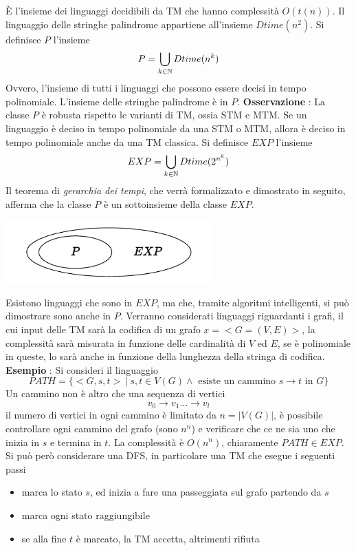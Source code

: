 \documentclass[10pt, letterpaper]{report}
\begin{document}
È l'insieme dei linguaggi decidibili da TM che hanno complessità $O(t(n))$. Il linguaggio delle stringhe palindrome appartiene all'insieme $Dtime(n^2)$.\acc 
{} Si definisce $P$ l'insieme 
$$ P=\bigcup_{k\in {\mathbb N}}Dtime(n^k)$$
Ovvero, l'insieme di tutti i linguaggi che possono essere decisi in tempo polinomiale. L'insieme delle stringhe palindrome è in $P$. \acc 
\textbf{Osservazione} : La classe $P$ è robusta rispetto le varianti di TM, ossia STM e MTM. Se un linguaggio è deciso in tempo polinomiale da una STM o MTM, allora è deciso in tempo polinomiale anche da una TM classica.\acc 
{} Si definisce $EXP$ l'insieme 
$$ EXP=\bigcup_{k\in {\mathbb N}}Dtime(2^{n^k})$$
Il teorema di \textit{gerarchia dei tempi}, che verrà formalizzato e dimostrato in seguito, afferma che la classe $P$ è un sottoinsieme della classe $EXP$.\begin{center}
    \includegraphics[width=0.6\textwidth ]{images/EXP.pdf}
\end{center}
Esistono linguaggi che sono in $EXP$, ma che, tramite algoritmi intelligenti, si può dimostrare sono anche in $P$. Verranno considerati linguaggi riguardanti i grafi, il cui input delle TM sarà la codifica di un grafo $x=<G=(V,E)>$, la complessità sarà misurata in funzione delle cardinalità di $V$ ed $E$, se è polinomiale in queste, lo sarà anche in funzione della lunghezza della stringa di codifica.\acc 
\textbf{Esempio} : Si consideri il linguaggio 
$$ PATH = \{<G,s,t> \ | \ s,t\in V(G) \land \text{ esiste un cammino }s\rightarrow t\text{ in }G\}$$
Un cammino non è altro che una sequenza di vertici $$v_0\rightarrow v_1 \dots \rightarrow v_l$$ il numero di vertici in ogni cammino è limitato da $n=|V(G)|$, è possibile controllare ogni cammino  del grafo (sono $n^n$) e verificare che ce ne sia uno che inizia in $s$ e termina in $t$. La complessità è $O(n^n)$, chiaramente $PATH\in EXP$.\acc 
Si può però considerare una DFS, in particolare una TM che esegue i seguenti passi\begin{itemize}
    \item marca lo stato $s$, ed inizia a fare una passeggiata sul grafo partendo da $s$
    \item marca ogni stato raggiungibile 
    \item se alla fine $t$ è marcato, la TM accetta, altrimenti rifiuta\hfill 
\end{itemize}
\end{document}
